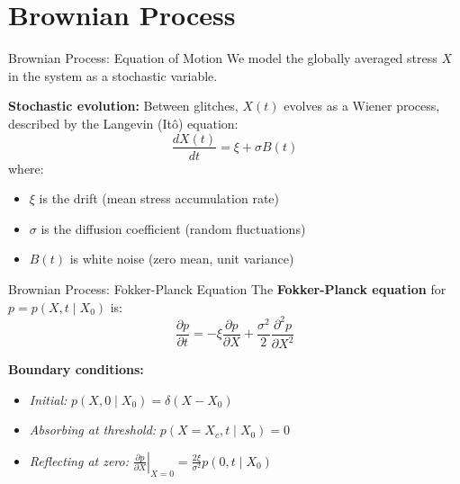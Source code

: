 \section{Brownian Process}

\begin{frame}{Brownian Process: Equation of Motion}
    We model the globally averaged stress $X$ in the system as a stochastic variable.

    \textbf{Stochastic evolution:}
    Between glitches, $X(t)$ evolves as a Wiener process, described by the Langevin (Itô) equation:
    \begin{equation}
    \frac{dX(t)}{dt} = \xi + \sigma B(t)
    \end{equation}
    where:
    \begin{itemize}
        \item $\xi$ is the drift (mean stress accumulation rate)
        \item $\sigma$ is the diffusion coefficient (random fluctuations)
        \item $B(t)$ is white noise (zero mean, unit variance)
    \end{itemize}
\end{frame}

\begin{frame}{Brownian Process: Fokker-Planck Equation}
    The \textbf{Fokker-Planck equation} for $p = p(X, t \mid X_0)$ is:
    \begin{equation}
    \frac{\partial p}{\partial t} = -\xi \frac{\partial p}{\partial X} + \frac{\sigma^2}{2} \frac{\partial^2 p}{\partial X^2}
    \end{equation}

    \textbf{Boundary conditions:}
    \begin{itemize}
        \item \textit{Initial:} $p(X, 0 \mid X_0) = \delta(X - X_0)$
        \item \textit{Absorbing at threshold:} $p(X = X_c, t \mid X_0) = 0$
        \item \textit{Reflecting at zero:} $\left. \frac{\partial p}{\partial X} \right|_{X=0} = \frac{2\xi}{\sigma^2} p(0, t \mid X_0)$
    \end{itemize}

\end{frame}
    
